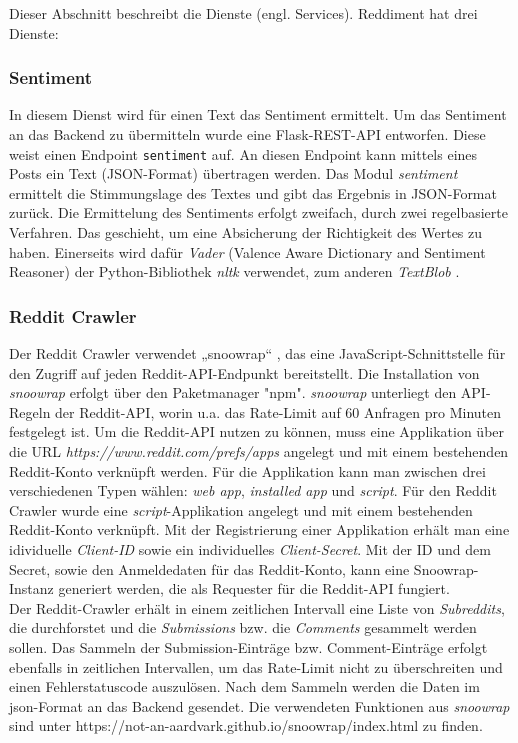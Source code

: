 \documentclass[a4paper, 10pt, conference]{IEEEtran}
\begin{document}
Dieser Abschnitt beschreibt die Dienste (engl. Services). Reddiment hat drei Dienste: 

\subsubsection{Sentiment}

In diesem Dienst wird für einen Text das Sentiment ermittelt. Um das Sentiment an das Backend zu übermitteln wurde eine Flask-REST-API entworfen. Diese weist einen Endpoint \texttt{\/sentiment} auf. An diesen Endpoint kann mittels eines Posts ein Text (JSON-Format) übertragen werden. Das Modul \textit{sentiment} ermittelt die Stimmungslage des Textes und gibt das Ergebnis in JSON-Format zurück. Die Ermittelung des Sentiments erfolgt zweifach, durch zwei regelbasierte Verfahren.  Das geschieht, um eine Absicherung der Richtigkeit des Wertes zu haben. Einerseits wird dafür \textit{Vader} \cite{vader}(Valence Aware Dictionary and Sentiment Reasoner) der Python-Bibliothek \textit{nltk} verwendet, zum anderen \textit{TextBlob} \cite{textblob}. 

\subsubsection{Reddit Crawler}

Der Reddit Crawler verwendet „snoowrap“ \cite{snoowrap}, das eine JavaScript-Schnittstelle für den Zugriff auf jeden Reddit-API-Endpunkt bereitstellt. Die Installation von \textit{snoowrap} erfolgt über den Paketmanager "npm". \textit{snoowrap} unterliegt den API-Regeln der Reddit-API, worin u.a. das Rate-Limit auf 60 Anfragen pro Minuten festgelegt ist. Um die Reddit-API nutzen zu können, muss eine Applikation über die URL \textit{https://www.reddit.com/prefs/apps} angelegt und mit einem bestehenden Reddit-Konto verknüpft werden. Für die Applikation kann man zwischen drei verschiedenen Typen wählen: \textit{web app}, \textit{installed app} und \textit{script}. Für den Reddit Crawler wurde eine \textit{script}-Applikation angelegt und mit einem bestehenden Reddit-Konto verknüpft. Mit der Registrierung einer Applikation erhält man eine idividuelle \textit{Client-ID} sowie ein individuelles \textit{Client-Secret}. Mit der ID und dem Secret, sowie den Anmeldedaten für das Reddit-Konto, kann eine Snoowrap-Instanz generiert werden, die als Requester für die Reddit-API fungiert.\\

Der Reddit-Crawler erhält in einem zeitlichen Intervall eine Liste von \textit{Subreddits}, die durchforstet und die \textit{Submissions} bzw. die \textit{Comments} gesammelt werden sollen. Das Sammeln der Submission-Einträge bzw. Comment-Einträge erfolgt ebenfalls in zeitlichen Intervallen, um das Rate-Limit nicht zu überschreiten und einen Fehlerstatuscode auszulösen. Nach dem Sammeln werden die Daten im json-Format an das Backend gesendet. Die verwendeten Funktionen aus \textit{snoowrap} sind unter https://not-an-aardvark.github.io/snoowrap/index.html zu finden.
\end{document}
